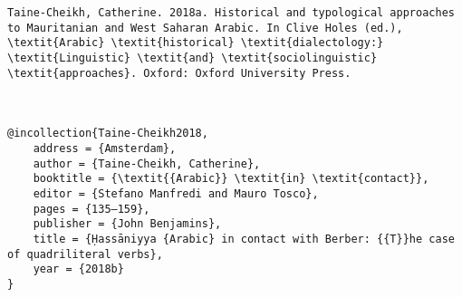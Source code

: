 \documentclass[output=paper]{langsci/langscibook}
\begin{document}
\begin{verbatim}
Taine-Cheikh, Catherine. 2018a. Historical and typological approaches to Mauritanian and West Saharan Arabic. In Clive Holes (ed.), \textit{Arabic} \textit{historical} \textit{dialectology:} \textit{Linguistic} \textit{and} \textit{sociolinguistic} \textit{approaches}. Oxford: Oxford University Press.



@incollection{Taine-Cheikh2018,
	address = {Amsterdam},
	author = {Taine-Cheikh, Catherine},
	booktitle = {\textit{{Arabic}} \textit{in} \textit{contact}},
	editor = {Stefano Manfredi and Mauro Tosco},
	pages = {135–159},
	publisher = {John Benjamins},
	title = {Ḥassāniyya {Arabic} in contact with Berber: {{T}}he case of quadriliteral verbs},
	year = {2018b}
}



\end{verbatim}
\sloppy
\printbibliography[heading=subbibliography,notkeyword=this]
\end{document}
